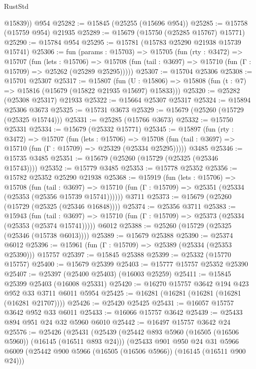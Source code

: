 \begin{lexlean}{RustStd}
\begin{coremodule}
        @15839))
    @954
@25282 := @15845 (@25255 (@15696 @954))
@25285 := @15758 (@15759 @954) @21935
@25289 := @15679 (@15750 (@25285 @15767) @15771)
@25290 := @15784 @954
@25295 := @15781 (@15783 @25290 @21938 @15739 @15741)
@25306 := fun (params : @15703) =>
  @15705
    (fun (rty : @3472) =>
    @15707
      (fun (lets : @15706) =>
      @15708 (fun (tail : @3697) => @15710 (fun (Γ : @15709) => @25262 (@25289 @25295)))))
@25307 := @15704 @25306
@25308 := @15701 @25307
@25317 := @15807
    (fun (U : @15806) => @15808 (fun (t : @7) => @15816 (@15679 (@15822 @21935 @15697) @15833)))
@25320 := @25282 (@25308 @25317) @21933
@25322 := @15664 @25307 @25317
@25324 := @15894 @25306 @3673
@25325 := @15731 @3673
@25329 := @15679 (@25260 (@15729 (@25325 @15744)))
@25331 := @25285 (@15766 @3673)
@25332 := @15750 @25331
@25334 := @15679 (@25332 @15771)
@25345 := @15897
    (fun (rty : @3472) =>
    @15707
      (fun (lets : @15706) =>
      @15708 (fun (tail : @3697) => @15710 (fun (Γ : @15709) => @25329 (@25334 @25295)))))
    @3485
@25346 := @15735 @3485
@25351 := @15679 (@25260 (@15729 (@25325 (@25346 @15743))))
@25352 := @15779 @3485
@25353 := @15778 @25352
@25356 := @15782 @25352 @25290 @21938
@25368 := @15919
    (fun (lets : @15706) =>
    @15708
      (fun (tail : @3697) =>
      @15710 (fun (Γ : @15709) => @25351 (@25334 (@25353 (@25356 @15739 @15741))))))
    @3711
@25373 := @15679 (@25260 (@15729 (@25325 (@25346 @16848))))
@25374 := @25356 @3711
@25383 := @15943
    (fun (tail : @3697) => @15710 (fun (Γ : @15709) => @25373 (@25334 (@25353 (@25374 @15741)))))
    @6012
@25388 := @25260 (@15729 (@25325 (@25346 (@15738 @6013))))
@25389 := @15679 @25388
@25390 := @25374 @6012
@25396 := @15961 (fun (Γ : @15709) => @25389 (@25334 (@25353 @25390))) @15757
@25397 := @15845 @25388
@25399 := @25332 (@15770 @15757)
@25400 := @15679 @25399
@25403 := @15777 @15757 @25352 @25390
@25407 := @25397 (@25400 @25403) (@16003 @25259)
@25411 := @15845 @25399 @25403 (@16008 @25331)
@25420 := @16270 @15757 @3642 @194 @423 @952 @33 @3711 @6011 @5954
@25425 := @16281 (@16281 (@16281 (@16281 (@16281 @21707))))
@25426 := @25420 @25425
@25431 := @16057 @15757 @3642 @952 @33 @6011
@25433 := @16066 @15757 @3642
@25439 := @25433 @894 @951 @24 @32 @5960 @6010
@25442 := @16497 @15757 @3642 @24
@25576 := @25426
    (@25431
      (@25439
        (@25442 @893 @5960 (@16505 (@16506 @5960)) (@16145 (@16511 @893 @24)))
        (@25433
          @901
          @950
          @24
          @31
          @5966
          @6009
          (@25442 @900 @5966 (@16505 (@16506 @5966)) (@16145 (@16511 @900 @24)))

\end{coremodule}
\end{lexlean}
